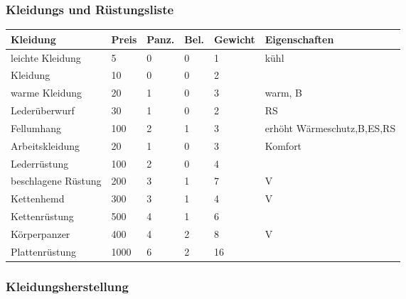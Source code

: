 \documentclass{article}
\begin{document}
\subsubsection{Kleidungs und Rüstungsliste}


\begin{small}
\begin{tabular}{|m{25mm}|m{1cm}|m{1cm}|m{1cm}|m{1cm}|m{6cm}|}
\hline
\textbf{Kleidung}&\textbf{Preis}&\textbf{Panz.}&\textbf{Bel.}&\textbf{Gewicht}&\textbf{Eigenschaften}\\
\hline
\hline
leichte Kleidung&5&0&0&1&kühl\\
\hline
Kleidung&10&0&0&2& \\
\hline
warme Kleidung&20&1&0&3&warm, B\\
\hline
Lederüberwurf&30&1&0&2&RS\\
\hline
Fellumhang&100&2&1&3&erhöht Wärmeschutz,B,ES,RS\\
\hline
Arbeitskleidung&20&1&0&3&Komfort\\
\hline
Lederrüstung&100&2&0&4& \\
\hline
beschlagene Rüstung&200&3&1&7&V\\
\hline
Kettenhemd&300&3&1&4&V\\
\hline
Kettenrüstung&500&4&1&6& \\
\hline
Körperpanzer&400&4&2&8&V\\
\hline
Plattenrüstung&1000&6&2&16& \\
\hline
\end{tabular}
\end{small}

\subsubsection{Kleidungsherstellung}
\end{document}
